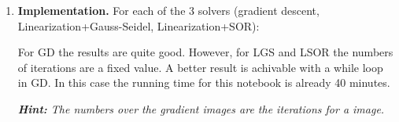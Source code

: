 \documentclass{paper}
\begin{document}
\begin{enumerate}
\pagebreak
\item \textbf{Implementation.} For each of the 3 solvers (gradient descent, \\ 
                               Linearization+Gauss-Seidel, Linearization+SOR):

For GD the results are quite good. However, for LGS and LSOR the numbers of iterations are a fixed value. A better result is achivable with a while loop in GD. In this case the running time for this notebook is already 40 minutes.

\textit{\textbf{Hint:} The numbers over the gradient images are the iterations for a image.}

\end{enumerate}
\end{document}
